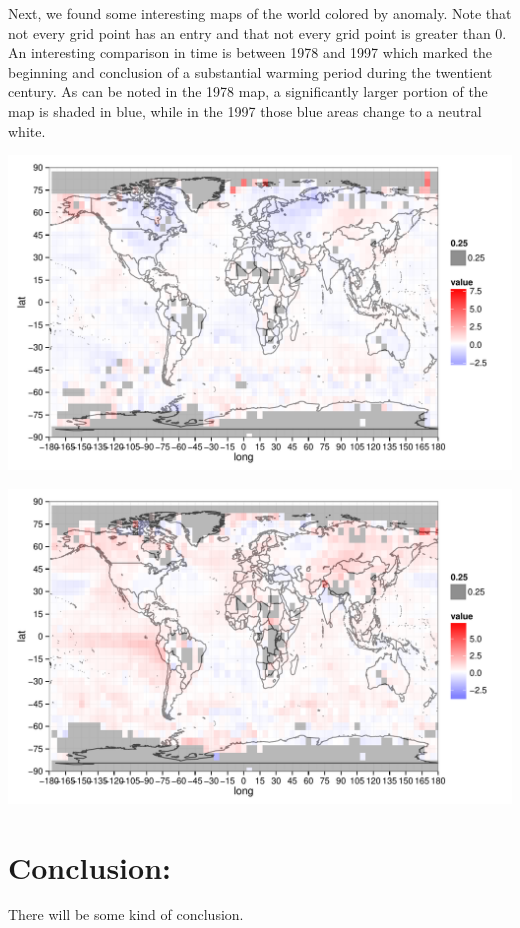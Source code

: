 \documentclass{article}\usepackage{graphicx, color}
\newenvironment{knitrout}{}{} %
\begin{document}
Next, we found some interesting maps of the world colored by anomaly. Note that not every grid point has an entry and that not every grid point is greater than 0. An interesting comparison in time is between 1978 and 1997 which marked the beginning and conclusion of a substantial warming period during the twentient century. As can be noted in the 1978 map, a significantly larger portion of the map is shaded in blue, while in the 1997 those blue areas change to a neutral white. 


\begin{knitrout}
\color{fgcolor}\includegraphics[width=\linewidth]{figure/1978-map} 
\end{knitrout}




\begin{knitrout}
\color{fgcolor}\includegraphics[width=\linewidth]{figure/1997-map} 
\end{knitrout}





\section{Conclusion:}
There will be some kind of conclusion.
\end{document}

